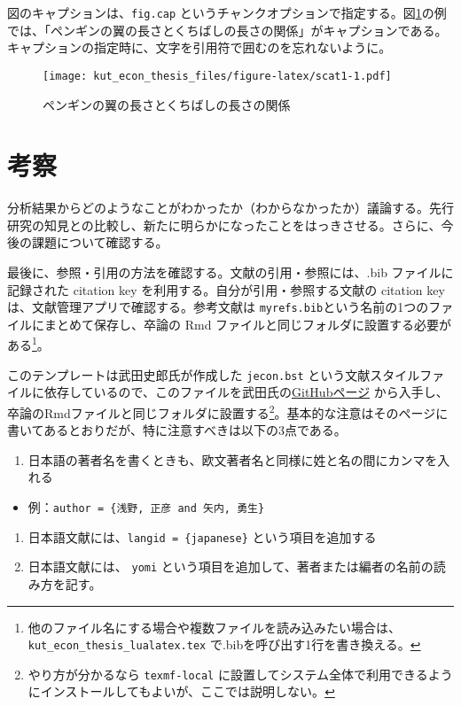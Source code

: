 \documentclass[lualatex,
               a4paper,
               10.5pt,
               ja=standard,
               jafont=ipaex]{bxjsarticle}
\providecommand{\tightlist}{%
  \setlength{\itemsep}{0pt}\setlength{\parskip}{0pt}}
\begin{document}
図のキャプションは、\texttt{fig.cap} というチャンクオプションで指定する。図\ref{fig:scat1}の例では、「ペンギンの翼の長さとくちばしの長さの関係」がキャプションである。キャプションの指定時に、文字を引用符で囲むのを忘れないように。

\begin{figure}
\centering
\texttt{[image: kut\_econ\_thesis\_files/figure-latex/scat1-1.pdf]}
\caption{\label{fig:scat1}ペンギンの翼の長さとくちばしの長さの関係}
\end{figure}

\section{考察}\label{ux8003ux5bdf}

分析結果からどのようなことがわかったか（わからなかったか）議論する。先行研究の知見との比較し、新たに明らかになったことをはっきさせる。さらに、今後の課題について確認する。

最後に、参照・引用の方法を確認する。文献の引用・参照には、.bib ファイルに記録された citation key を利用する。自分が引用・参照する文献の citation key は、文献管理アプリで確認する。参考文献は \texttt{myrefs.bib}という名前の1つのファイルにまとめて保存し、卒論の Rmd ファイルと同じフォルダに設置する必要がある\footnote{他のファイル名にする場合や複数ファイルを読み込みたい場合は、\texttt{kut\_econ\_thesis\_lualatex.tex} で.bibを呼び出す1行を書き換える。}。

このテンプレートは武田史郎氏が作成した \texttt{jecon.bst} という文献スタイルファイルに依存しているので、このファイルを武田氏の\href{https://github.com/ShiroTakeda/jecon-bst/}{GitHubページ} から入手し、卒論のRmdファイルと同じフォルダに設置する\footnote{やり方が分かるなら \texttt{texmf-local} に設置してシステム全体で利用できるようにインストールしてもよいが、ここでは説明しない。}。基本的な注意はそのページに書いてあるとおりだが、特に注意すべきは以下の3点である。

\begin{enumerate}
\def\labelenumi{\arabic{enumi}.}
\tightlist
\item
  日本語の著者名を書くときも、欧文著者名と同様に姓と名の間にカンマを入れる
\end{enumerate}

\begin{itemize}
\tightlist
\item
  例：\texttt{author\ =\ \{浅野,\ 正彦\ and\ 矢内,\ 勇生\}}
\end{itemize}

\begin{enumerate}
\def\labelenumi{\arabic{enumi}.}
\setcounter{enumi}{1}
\tightlist
\item
  日本語文献には、\texttt{langid\ =\ \{japanese\}} という項目を追加する
\item
  日本語文献には、 \texttt{yomi} という項目を追加して、著者または編者の名前の読み方を記す。
\end{enumerate}
\end{document}
